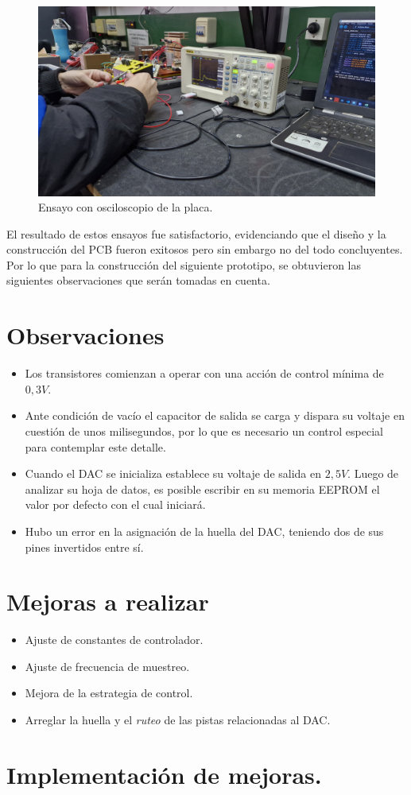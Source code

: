 \begin{figure}[H]
    \centering
    \includegraphics[width=\textwidth]{./imagenes/fotos/osciloscopio.jpg}
    \caption{Ensayo con osciloscopio de la placa.}
    \label{F:esayos_y_pruebas}
\end{figure}
El resultado de estos ensayos fue satisfactorio, evidenciando que el diseño y la construcción del PCB fueron exitosos pero sin embargo no del todo concluyentes. Por lo que para la construcción del siguiente prototipo, se obtuvieron las siguientes observaciones que serán tomadas en cuenta.  \par 
\section*{Observaciones}
\begin{itemize}
    \item Los transistores comienzan a operar con una acción de control mínima de $0,3V$.
    \item Ante condición de vacío el capacitor de salida se carga y dispara su voltaje en cuestión de unos milisegundos, por lo que es necesario un control especial para contemplar este detalle.
    \item Cuando el DAC se inicializa establece su voltaje de salida en $2,5V$. Luego de analizar su hoja de datos, es posible escribir en su memoria EEPROM el valor por defecto con el cual iniciará.
    \item Hubo un error en la asignación de la huella del DAC, teniendo dos de sus pines invertidos entre sí.
\end{itemize}

\section*{Mejoras a realizar}
\begin{itemize}
    \item Ajuste de constantes de controlador.
    \item Ajuste de frecuencia de muestreo.
    \item Mejora de la estrategia de control.
    \item Arreglar la huella y el \textit{ruteo} de las pistas relacionadas al DAC.
\end{itemize}

\section{Implementación de mejoras.}
